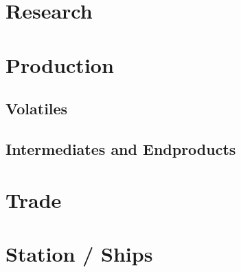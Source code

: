 \section{Research}

\section{Production}

\subsection{Volatiles}

\subsection{Intermediates and Endproducts}

\section{Trade}

\section{Station / Ships}
